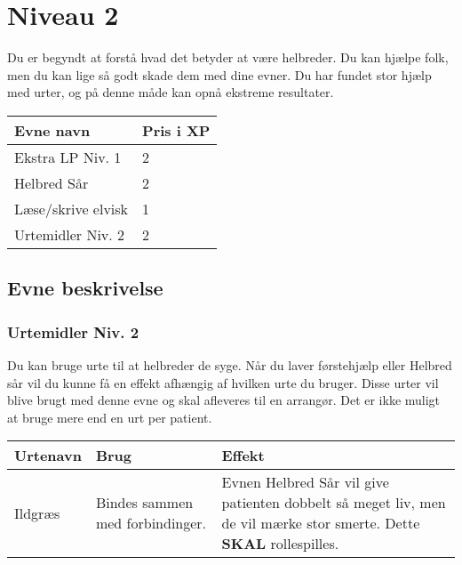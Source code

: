 \chapter*{Niveau 2}
Du er begyndt at forstå hvad det betyder at være helbreder. Du kan hjælpe folk, men du kan lige så godt skade dem med dine evner. Du har fundet stor hjælp med urter, og på denne måde kan opnå ekstreme resultater.
\begin{table}[H]
    \centering
    \begin{tabular}{|p{}|p{}|}
    \rowcolor{cerulean!80}\hline
    Evne navn & Pris i XP \\\hline
    Ekstra LP Niv. 1 & 2\\\hline
    Helbred Sår & 2\\\hline
    Læse/skrive elvisk & 1\\\hline
    Urtemidler Niv. 2 & 2 \\\hline
    \end{tabular}
\end{table}
\section*{Evne beskrivelse}







\subsection*{Urtemidler Niv. 2}

Du kan bruge urte til at helbreder de syge. Når du laver førstehjælp eller Helbred sår vil du kunne få en effekt afhængig af hvilken urte du bruger. Disse urter vil blive brugt med denne evne og skal afleveres til en arrangør. Det er ikke muligt at bruge mere end en urt per patient.
\begin{table}[H]
     \centering
    \begin{tabular}{|p{}|p{}|p{}|}
    \rowcolor{cerulean!80}\hline
        Urtenavn & Brug & Effekt \\\hline
    Ildgræs & Bindes sammen med forbindinger. & Evnen Helbred Sår vil give patienten dobbelt så meget liv, men de vil mærke stor smerte. Dette \textbf{SKAL} rollespilles.\\\hline
    \end{tabular}
\end{table}